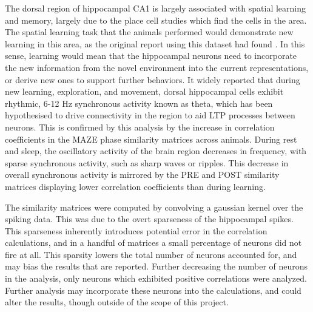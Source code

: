 \documentclass[9pt,twocolumn,twoside,lineno]{pnas-new}
\begin{document}
The dorsal region of hippocampal CA1 is largely associated with spatial learning and memory, largely due to the place cell studies which find the cells in the area. The spatial learning task that the animals performed would demonstrate new learning in this area, as the original report using this dataset had found \cite{grosmark2016diversity}. In this sense, learning would mean that the hippocampal neurons need to incorporate the new information from the novel environment into the current representations, or derive new ones to support further behaviors. It widely reported that during new learning, exploration, and movement, dorsal hippocampal cells exhibit rhythmic, 6-12 Hz synchronous activity known as theta, which has been hypothesised to drive connectivity in the region to aid LTP processes between neurons. This is confirmed by this analysis by the increase in correlation coefficients in the MAZE phase similarity matrices across animals. During rest and sleep, the oscillatory activity of the brain region decreases in frequency, with sparse synchronous activity, such as sharp waves or ripples. This decrease in overall synchronous activity is mirrored by the PRE and POST similarity matrices displaying lower correlation coefficients than during learning.

The similarity matrices were computed by convolving a gaussian kernel over the spiking data. This was due to the overt sparseness of the hippocampal spikes. This sparseness inherently introduces potential error in the correlation calculations, and in a handful of matrices a small percentage of neurons did not fire at all. This sparsity lowers the total number of neurons accounted for, and may bias the results that are reported. Further decreasing the number of neurons in the analysis, only neurons which exhibited positive correlations were analyzed. Further analysis may incorporate these neurons into the calculations, and could alter the results, though outside of the scope of this project.
\end{document}
